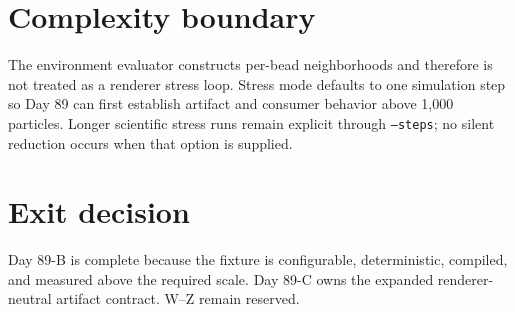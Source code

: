 \documentclass[11pt]{article}
\begin{document}
\section{Complexity boundary}
The environment evaluator constructs per-bead neighborhoods and therefore is not treated as a renderer stress loop. Stress mode defaults to one simulation step so Day 89 can first establish artifact and consumer behavior above 1,000 particles. Longer scientific stress runs remain explicit through \texttt{--steps}; no silent reduction occurs when that option is supplied.

\section{Exit decision}
Day 89-B is complete because the fixture is configurable, deterministic, compiled, and measured above the required scale. Day 89-C owns the expanded renderer-neutral artifact contract. W--Z remain reserved.
\end{document}
